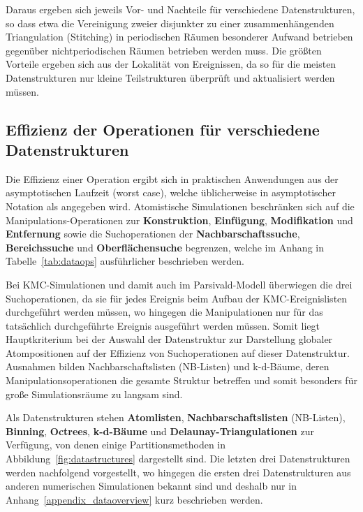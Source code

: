 Daraus ergeben sich jeweils Vor- und Nachteile für verschiedene Datenstrukturen, so dass etwa die Vereinigung zweier disjunkter zu einer zusammenhängenden Triangulation (Stitching) in periodischen Räumen besonderer Aufwand betrieben gegenüber nichtperiodischen Räumen betrieben werden muss.
Die größten Vorteile ergeben sich aus der Lokalität von Ereignissen, da so für die meisten Datenstrukturen nur kleine Teilstrukturen überprüft und aktualisiert werden müssen.

\subsection{Effizienz der Operationen für verschiedene Datenstrukturen}

Die Effizienz einer Operation ergibt sich in praktischen Anwendungen aus der asymptotischen Laufzeit (worst case), welche üblicherweise in asymptotischer Notation als \BigO{} angegeben wird.
Atomistische Simulationen beschränken sich auf die Manipulations-Operationen zur \textbf{Konstruktion}, \textbf{Einfügung}, \textbf{Modifikation} und \textbf{Entfernung} sowie die Suchoperationen der \textbf{Nachbarschaftssuche}, \textbf{Bereichssuche} und \textbf{Oberflächensuche} begrenzen, welche im Anhang in Tabelle~\ref{tab:dataops} ausführlicher beschrieben werden.

Bei KMC-Simulationen und damit auch im Parsivald-Modell überwiegen die drei Suchoperationen, da sie für jedes Ereignis beim Aufbau der KMC-Ereignislisten durchgeführt werden müssen, wo hingegen die Manipulationen nur für das tatsächlich durchgeführte Ereignis ausgeführt werden müssen.
Somit liegt Hauptkriterium bei der Auswahl der Datenstruktur zur Darstellung globaler Atompositionen auf der Effizienz von Suchoperationen auf dieser Datenstruktur.
Ausnahmen bilden Nachbarschaftslisten (NB-Listen) und k-d-Bäume, deren Manipulationsoperationen die gesamte Struktur betreffen und somit besonders für große Simulationsräume zu langsam sind.

Als Datenstrukturen stehen \textbf{Atomlisten}, \textbf{Nachbarschaftslisten} (NB-Listen), \textbf{Binning}, \textbf{Octrees}, \textbf{k-d-Bäume} und \textbf{Delaunay-Triangulationen} zur Verfügung, von denen einige Partitionsmethoden in Abbildung~\ref{fig:datastructures} dargestellt sind.
Die letzten drei Datenstrukturen werden nachfolgend vorgestellt, wo hingegen die ersten drei Datenstrukturen aus anderen numerischen Simulationen bekannt sind und deshalb nur in Anhang~\ref{appendix_dataoverview} kurz beschrieben werden.

